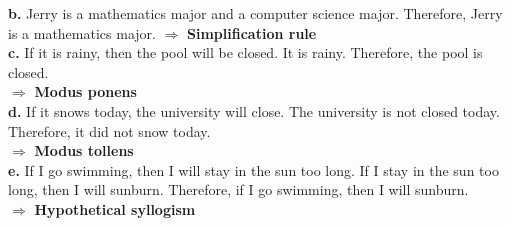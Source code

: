 \documentclass[10pt]{article}
\begin{document}
    \textbf{b.} Jerry is a mathematics major and a computer science major. Therefore,
    Jerry is a mathematics major.
        $\Rightarrow$ \textbf{Simplification rule} \\

    \textbf{c.} If it is rainy, then the pool will be closed. It is rainy.
    Therefore, the pool is closed. \\
        $\Rightarrow$ \textbf{Modus ponens} \\


    \textbf{d.} If it snows today, the university will close. The university is not
    closed today. Therefore, it did not snow today. \\
        $\Rightarrow$ \textbf{Modus tollens} \\

    \textbf{e.} If I go swimming, then I will stay in the sun too long. If I stay in
    the sun too long, then I will sunburn. Therefore, if I go swimming, then I will sunburn. \\
        $\Rightarrow$ \textbf{Hypothetical syllogism} \\
\end{document}
